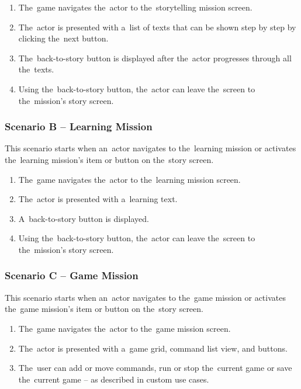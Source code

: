 \begin{enumerate}
    \item The~game navigates the~actor to the~storytelling mission screen.
    \item The~actor is presented with a~list of texts that can be shown step by step by clicking the~next button.
    \item The~back-to-story button is displayed after the~actor progresses through all the~texts.
    \item Using the~back-to-story button, the~actor can leave the~screen to the~mission's story screen.
\end{enumerate}

\subsubsection*{Scenario B -- Learning Mission}

This scenario starts when an~actor navigates to the~learning mission or activates the~learning mission's item or button on the~story screen.

\begin{enumerate}
    \item The~game navigates the~actor to the~learning mission screen.
    \item The~actor is presented with a~learning text.
    \item A~back-to-story button is displayed.
    \item Using the~back-to-story button, the~actor can leave the~screen to the~mission's story screen.
\end{enumerate}

\subsubsection*{Scenario C -- Game Mission}

This scenario starts when an~actor navigates to the~game mission or activates the~game mission's item or button on the~story screen.

\begin{enumerate}
    \item The~game navigates the~actor to the~game mission screen.
    \item The~actor is presented with a~game grid, command list view, and buttons.
    \item The~user can add or move commands, run or stop the~current game or save the~current game -- as described in custom use cases.
\end{enumerate}

